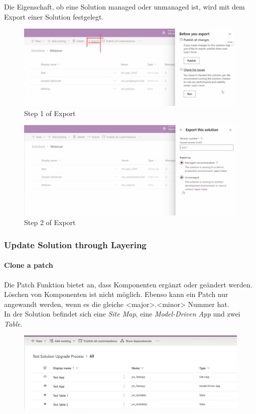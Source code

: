 Die Eigenschaft, ob eine Solution managed oder unmanaged ist, wird mit dem Export einer Solution festgelegt.
\begin{figure}[H]
	\centering
	\includegraphics[scale = 0.3]{attachment/chapter_13/Scc032}
	\caption{Step 1 of Export} 
\end{figure}
\begin{figure}[H]
	\centering
	\includegraphics[scale = 0.3]{attachment/chapter_13/Scc033}
	\caption{Step 2 of Export} 
\end{figure}

\subsubsection{Update Solution through Layering}
\paragraph*{Clone a patch}
Die Patch Funktion bietet an, dass Komponenten ergänzt oder geändert werden. Löschen von Komponenten ist nicht möglich. Ebenso kann ein Patch nur angewandt werden, wenn es die gleiche <major>.<minor> Nummer hat. \\

In der Solution befindet sich eine \textit{Site Map}, eine \textit{Model-Driven App} und zwei \textit{Table}.
\begin{figure}[H]
	\centering
	\includegraphics[scale = 0.3]{attachment/chapter_13/Scc034}
\end{figure}

